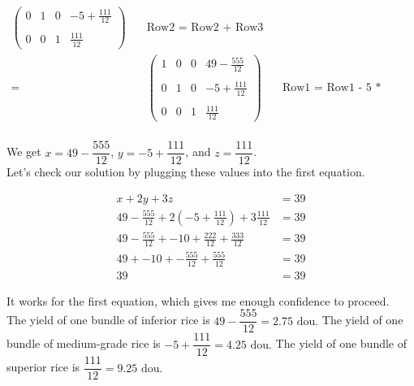 \documentclass{article}
\begin{document}
\begin{align*}
\begin{pmatrix}
0 & 1 & 0 & -5 + \frac{111}{12} \\ \\
0 & 0 & 1 & \frac{111}{12}
\end{pmatrix} \quad &\text{Row2 = Row2 + Row3} \\
= & \begin{pmatrix}
1 & 0 & 0 & 49 - \frac{555}{12} \\ \\
0 & 1 & 0 & -5 + \frac{111}{12} \\ \\
0 & 0 & 1 & \frac{111}{12}
\end{pmatrix} \quad &\text{Row1 = Row1 - 5 * Row3} \\
\end{align*}

We get $x = 49 - \dfrac{555}{12}$, $y = -5 + \dfrac{111}{12}$, and $z = \dfrac{111}{12}$. \\

Let's check our solution by plugging these values into the first equation.

\begin{align*}
x + 2y + 3z &= 39 \\
49 - \frac{555}{12} + 2(-5 + \frac{111}{12}) + 3 \frac{111}{12} &= 39 \\
49 - \frac{555}{12} + -10 + \frac{222}{12} + \frac{333}{12} &= 39 \\
49 + -10 + -\frac{555}{12} + \frac{555}{12} &= 39 \\
39 &= 39
\end{align*}

It works for the first equation, which gives me enough confidence to proceed. \\

The yield of one bundle of inferior rice is $\boxed{49 - \dfrac{555}{12} = 2.75 \text{ dou}.}$ The yield of one bundle of medium-grade rice is $\boxed{-5 + \dfrac{111}{12} = 4.25 \text{ dou}.}$ The yield of one bundle of superior rice is $\boxed{\dfrac{111}{12} = 9.25 \text{ dou}.}$
\end{document}
